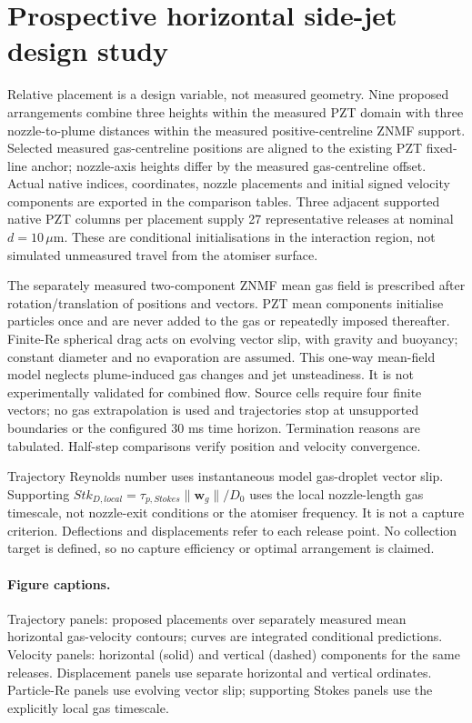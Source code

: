 \section{Prospective horizontal side-jet design study}
Relative placement is a design variable, not measured geometry. Nine proposed
arrangements combine three heights within the measured PZT domain with three
nozzle-to-plume distances within the measured positive-centreline ZNMF support.
Selected measured gas-centreline positions are aligned to the existing PZT
fixed-line anchor; nozzle-axis heights differ by the measured gas-centreline offset.
Actual native indices, coordinates, nozzle placements and initial signed velocity
components are exported in the comparison tables. Three adjacent supported native
PZT columns per placement supply 27 representative releases at nominal $d=10\,\mu$m.
These are conditional initialisations in the interaction region, not simulated
unmeasured travel from the atomiser surface.

The separately measured two-component ZNMF mean gas field is prescribed after
rotation/translation of positions and vectors. PZT mean components initialise
particles once and are never added to the gas or repeatedly imposed thereafter.
Finite-Re spherical drag acts on evolving vector slip, with gravity and buoyancy;
constant diameter and no evaporation are assumed. This one-way mean-field model
neglects plume-induced gas changes and jet unsteadiness. It is not experimentally
validated for combined flow. Source cells require four finite vectors; no gas
extrapolation is used and trajectories stop at unsupported boundaries or the
configured 30 ms time horizon. Termination reasons are tabulated. Half-step
comparisons verify position and velocity convergence.

Trajectory Reynolds number uses instantaneous model gas-droplet vector slip.
Supporting $Stk_{D,local}=\tau_{p,Stokes}\lVert\boldsymbol w_g\rVert/D_0$
uses the local nozzle-length gas timescale, not nozzle-exit conditions or the
atomiser frequency. It is not a capture criterion. Deflections and displacements
refer to each release point. No collection target is defined, so no capture
efficiency or optimal arrangement is claimed.

\paragraph{Figure captions.} Trajectory panels: proposed placements over
separately measured mean horizontal gas-velocity contours; curves are integrated
conditional predictions. Velocity panels: horizontal (solid) and vertical (dashed) components for the same releases. Displacement panels use separate horizontal and vertical ordinates. Particle-Re panels use
evolving vector slip; supporting Stokes panels use the explicitly local gas timescale.


